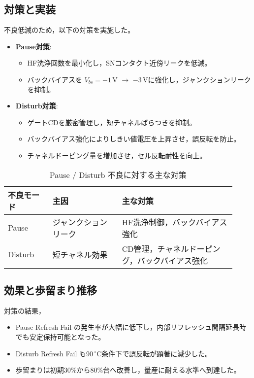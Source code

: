 \documentclass[conference]{IEEEtran}
\begin{document}
\subsection{対策と実装}
不良低減のため，以下の対策を実施した。
\begin{itemize}
  \item \textbf{Pause対策}:
    \begin{itemize}
      \item HF洗浄回数を最小化し，SNコンタクト近傍リークを低減。
      \item バックバイアスを $V_{bs}=-1$\,V $\rightarrow$ $-3$\,Vに強化し，ジャンクションリークを抑制。
    \end{itemize}
  \item \textbf{Disturb対策}:
    \begin{itemize}
      \item ゲートCDを厳密管理し，短チャネルばらつきを抑制。
      \item バックバイアス強化によりしきい値電圧を上昇させ，誤反転を防止。
      \item チャネルドーピング量を増加させ，セル反転耐性を向上。
    \end{itemize}
\end{itemize}

\begin{table}[t]
\centering
\caption{Pause / Disturb 不良に対する主な対策}
\label{tab:pause_disturb}
\begin{tabular}{p{0.18\linewidth} p{0.28\linewidth} p{0.46\linewidth}}
\toprule
不良モード & 主因 & 主な対策 \\
\midrule
Pause   & ジャンクションリーク 
        & HF洗浄制御，バックバイアス強化 \\
Disturb & 短チャネル効果 
        & CD管理，チャネルドーピング，バックバイアス強化 \\
\bottomrule
\end{tabular}
\end{table}

\subsection{効果と歩留まり推移}
対策の結果，
\begin{itemize}
  \item Pause Refresh Fail の発生率が大幅に低下し，内部リフレッシュ間隔延長時でも安定保持可能となった。
  \item Disturb Refresh Fail も90\,$^\circ$C条件下で誤反転が顕著に減少した。
  \item 歩留まりは初期30\%から80\%台へ改善し，量産に耐える水準へ到達した。
\end{itemize}
\end{document}
